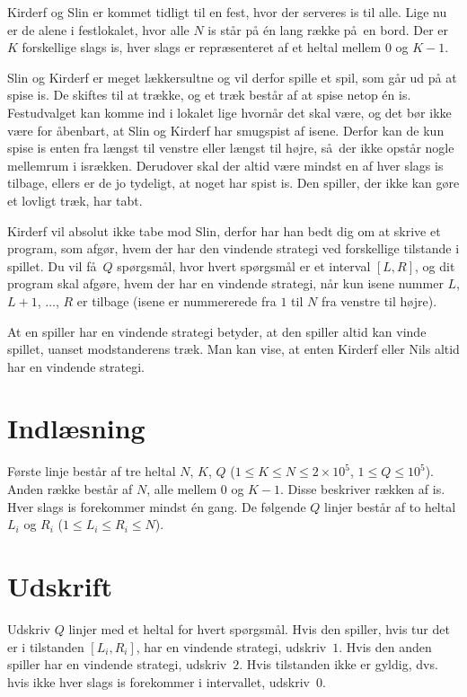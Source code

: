 
Kirderf og Slin er kommet tidligt til en fest, hvor der serveres is til alle.
Lige nu er de alene i festlokalet, hvor alle $N$ is står på én lang række på en bord.
Der er $K$ forskellige slags is, hver slags er repræsenteret af et heltal mellem $0$ og $K-1$.


Slin og Kirderf er meget lækkersultne og vil derfor spille et spil, som går ud på at spise is.
De skiftes til at trække, og et træk består af at spise netop én is.
Festudvalget kan komme ind i lokalet lige hvornår det skal være, og det bør ikke være for åbenbart, at Slin og Kirderf har smugspist af isene.
Derfor kan de kun spise is enten fra længst til venstre eller længst til højre, så der ikke opstår nogle mellemrum i isrækken.
Derudover skal der altid være mindst en af hver slags is tilbage, ellers er de jo tydeligt, at noget har spist is.
Den spiller, der ikke kan gøre et lovligt træk, har tabt.

Kirderf vil absolut ikke tabe mod Slin, derfor har han bedt dig om at skrive et program, som afgør, hvem der har den vindende strategi ved forskellige tilstande i spillet.
Du vil få $Q$ spørgsmål, hvor hvert spørgsmål er et interval $[L,R]$, og dit program skal afgøre, hvem der har en vindende strategi, når kun isene nummer $L$, $L+1$, $\dots$, $R$ er tilbage (isene er nummererede fra $1$ til $N$ fra venstre til højre).

At en spiller har en vindende strategi betyder, at den spiller altid kan vinde spillet, uanset modstanderens træk.
Man kan vise, at enten Kirderf eller Nils altid har en vindende strategi.

\section*{Indlæsning}

Første linje består af tre heltal $N$, $K$, $Q$ ($1 \le K \le N \le 2 \times 10^5$, $1 \le Q \le 10^5$).
Anden række består af $N$, alle mellem $0$ og $K-1$.
Disse beskriver rækken af is.
Hver slags is forekommer mindst én gang.
De følgende $Q$ linjer består af  to heltal $L_i$ og $R_i$ ($1 \le L_i \le R_i \le N$).

\section*{Udskrift}

Udskriv $Q$ linjer med et heltal for hvert spørgsmål.
Hvis den spiller, hvis tur det er i tilstanden $[L_i, R_i]$, har en vindende strategi, udskriv~$1$.
Hvis den anden spiller har en vindende strategi, udskriv~$2$.
Hvis tilstanden ikke er gyldig, dvs. hvis ikke hver slags is forekommer i intervallet, udskriv~$0$.

